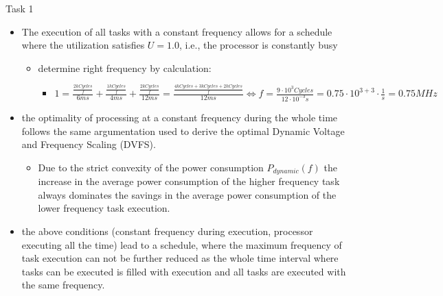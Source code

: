 \begin{frame}[allowframebreaks]{Task 1}{}
\begin{solutionnoinc}
    \begin{itemize}
      \item The execution of all tasks with a constant frequency allows for a schedule where the utilization satisfies $U = 1.0$, i.e., the processor is constantly busy
        \begin{itemize}
          \item determine right frequency by calculation:
            \begin{itemize}
              \item $1 = \frac{\frac{2 kCycles}{f}}{6ms} + \frac{\frac{1 kCycles}{f}}{4ms}  + \frac{\frac{2 kCycles}{f}}{12ms} = \frac{\frac{4 kCycles + 3 kCycles + 2 kCycles}{f}}{12ms} \Leftrightarrow f = \frac{9 \cdot 10^3 Cycles}{12 \cdot 10^{-3} s} = 0.75 \cdot 10^{3 + 3} \cdot \frac{1}{s}  = 0.75MHz$
            \end{itemize}
        \end{itemize}
      \item the optimality of processing at a constant frequency during the whole time follows the same argumentation used to derive the optimal Dynamic Voltage and Frequency Scaling (DVFS).
      \begin{itemize}
        \item Due to the strict convexity of the power consumption $P_{dynamic}(f)$ the increase in the average power consumption of the higher frequency task always dominates the savings in the average power consumption of the lower frequency task execution.
      \end{itemize}
    \end{itemize}
  \end{solutionnoinc}
  \begin{solutionnoinc}
    \small
    \begin{itemize}
      \item the above conditions (constant frequency during execution, processor executing all the time) lead to a schedule, where the maximum frequency of task execution can not be further reduced as the whole time interval where tasks can be executed is filled with execution and all tasks are executed with the same frequency.
    \end{itemize}
  \end{solutionnoinc}
  \if{}
\end{frame}
